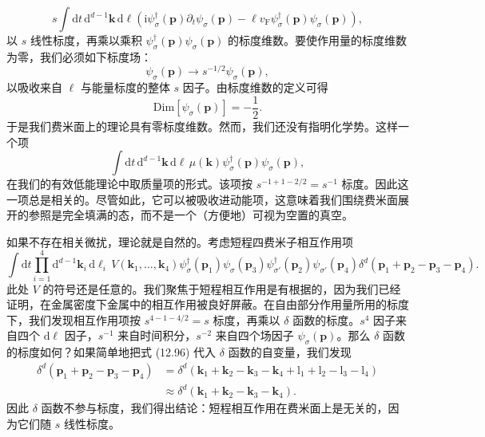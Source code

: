 \begin{equation*}
s\int\mathrm d t\,\mathrm d^{d-1}\mathbf k\,\mathrm d\ell\left(\mathrm i\psi^\dagger_\sigma(\mathbf p)\partial_t\psi_\sigma(\mathbf p)-\ell v_{\mathrm F}\psi^\dagger_\sigma(\mathbf p)\psi_\sigma(\mathbf p)\right), \tag{12.99}
\end{equation*}
以 $s$ 线性标度，再乘以乘积 $\psi^\dagger_\sigma(\mathbf p)\psi_\sigma(\mathbf p)$ 的标度维数。要使作用量的标度维数为零，我们必须如下标度场：
\begin{equation*}
\psi_\sigma(\mathbf p)\to s^{-1/2}\psi_\sigma(\mathbf p), \tag{12.100}
\end{equation*}
以吸收来自 $\ell$ 与能量标度的整体 $s$ 因子。由标度维数的定义可得
\begin{equation*}
\mathrm{Dim}\left[\psi_\sigma(\mathbf p)\right]=-\frac{1}{2}. \tag{12.101}
\end{equation*}
于是我们费米面上的理论具有零标度维数。然而，我们还没有指明化学势。这样一个项
\begin{equation*}
\int\mathrm d t\,\mathrm d^{d-1}\mathbf k\,\mathrm d\ell\,\mu(\mathbf k)\psi^\dagger_\sigma(\mathbf p)\psi_\sigma(\mathbf p), \tag{12.102}
\end{equation*}
在我们的有效低能理论中取质量项的形式。该项按 $s^{-1+1-2/2}=s^{-1}$ 标度。因此这一项总是相关的。尽管如此，它可以被吸收进动能项，这意味着我们围绕费米面展开的参照是完全填满的态，而不是一个（方便地）可视为空置的真空。

如果不存在相关微扰，理论就是自然的。考虑短程四费米子相互作用项
\begin{equation*}
\int\mathrm d t\prod_{i=1}^{4}\mathrm d^{d-1}\mathbf k_i\,\mathrm d\ell_i\,V(\mathbf k_1,\ldots,\mathbf k_4)\psi^\dagger_\sigma(\mathbf p_1)\psi_\sigma(\mathbf p_3)\psi^\dagger_{\sigma'}(\mathbf p_2)\psi_{\sigma'}(\mathbf p_4)\delta^d(\mathbf p_1+\mathbf p_2-\mathbf p_3-\mathbf p_4). \tag{12.103}
\end{equation*}
此处 $V$ 的符号还是任意的。我们聚焦于短程相互作用是有根据的，因为我们已经证明，在金属密度下金属中的相互作用被良好屏蔽。在自由部分作用量所用的标度下，我们发现相互作用项按 $s^{4-1-4/2}=s$ 标度，再乘以 $\delta$ 函数的标度。$s^4$ 因子来自四个 $\mathrm d\ell$ 因子，$s^{-1}$ 来自时间积分，$s^{-2}$ 来自四个场因子 $\psi_\sigma(\mathbf p)$。那么 $\delta$ 函数的标度如何？如果简单地把式 (12.96) 代入 $\delta$ 函数的自变量，我们发现
\begin{align*}
\delta^d(\mathbf p_1+\mathbf p_2-\mathbf p_3-\mathbf p_4)&=\delta^d(\mathbf k_1+\mathbf k_2-\mathbf k_3-\mathbf k_4+\mathrm l_1+\mathrm l_2-\mathrm l_3-\mathrm l_4)\\
&\approx\delta^d(\mathbf k_1+\mathbf k_2-\mathbf k_3-\mathbf k_4). \tag{12.104}
\end{align*}
因此 $\delta$ 函数不参与标度，我们得出结论：短程相互作用在费米面上是无关的，因为它们随 $s$ 线性标度。

